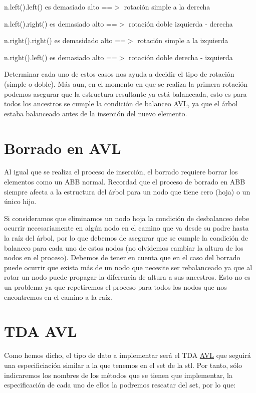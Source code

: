 \begin{DoxyItemize}
\item n.\-left().left() es demasiado alto ==$>$ rotación simple a la derecha \item n.\-left().right() es demasiado alto ==$>$ rotación doble izquierda -\/ derecha \item n.\-right().right() es demasidado alto ==$>$ rotación simple a la izquierda \item n.\-right().left() es demasiado alto ==$>$ rotación doble derecha -\/ izquierda\end{DoxyItemize}
Determinar cada uno de estos casos nos ayuda a decidir el tipo de rotación (simple o doble). Más aun, en el momento en que se realiza la primera rotación podemos asegurar que la estructura resultante ya está balanceada, esto es para todos los ancestros se cumple la condición de balanceo \hyperlink{classAVL}{A\-V\-L}, ya que el árbol estaba balanceado antes de la inserción del nuevo elemento.\hypertarget{index_Borrar}{}\section{Borrado en A\-V\-L}\label{index_Borrar}
Al igual que se realiza el proceso de inserción, el borrado requiere borrar los elementos como un A\-B\-B normal. Recordad que el proceso de borrado en A\-B\-B siempre afecta a la estructura del árbol para un nodo que tiene cero (hoja) o un único hijo.

Si consideramos que eliminamos un nodo hoja la condición de desbalanceo debe ocurrir necesariamente en algún nodo en el camino que va desde su padre hasta la raíz del árbol, por lo que debemos de asegurar que se cumple la condición de balanceo para cada uno de estos nodos (no olvidemos cambiar la altura de los nodos en el proceso). Debemos de tener en cuenta que en el caso del borrado puede ocurrir que exista más de un nodo que necesite ser rebalanceado ya que al rotar un nodo puede propagar la diferencia de altura a sus ancestros. Esto no es un problema ya que repetiremos el proceso para todos los nodos que nos encontremos en el camino a la raíz.\hypertarget{index_tda}{}\section{T\-D\-A A\-V\-L}\label{index_tda}
Como hemos dicho, el tipo de dato a implementar será el T\-D\-A \hyperlink{classAVL}{A\-V\-L} que seguirá una especificiación similar a la que tenemos en el set de la stl. Por tanto, sólo indicaremos los nombres de los métodos que se tienen que implementar, la especificación de cada uno de ellos la podremos rescatar del set, por lo que\-:

